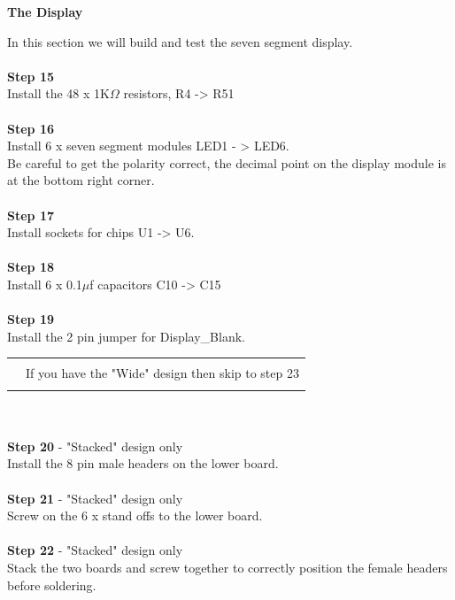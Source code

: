 \documentclass{ol-softwaremanual}
\newcommand{\Note}[1]{
\begin{table}[h]
\begin{tabular}{|p{0.1\textwidth}p{0.8\textwidth}|}
\hline
 & \\
\multicolumn{1}{|r}{\Huge\warning} & #1\\
 &  \\ \hline
\end{tabular}
\end{table}
}
\begin{document}
\begin{ffcode}
\begin{center}
\textbf{The Display}
\end{center}
In this section we will build and test the seven segment display.\\
\\
\textbf{Step 15}\\
Install the 48 x 1K$\Omega$ resistors, R4 -> R51\\
\\
\textbf{Step 16}\\
Install 6 x seven segment modules LED1 - > LED6.\\
Be careful to get the polarity correct, the decimal point on the display module is at the bottom right corner.\\
\\
\textbf{Step 17}\\
Install sockets for chips U1 -> U6.\\
\\
\textbf{Step 18}\\
Install 6 x 0.1$\mu$f capacitors C10 -> C15\\
\\
\textbf{Step 19}\\
Install the 2 pin jumper for Display\_Blank.
\Note{If you have the "Wide" design then skip to step 23}\\
\\
\textbf{Step 20} - "Stacked" design only\\
Install the 8 pin male headers on the lower board.\\
\\
\textbf{Step 21} - "Stacked" design only\\
Screw on the 6 x stand offs to the lower board.\\
\\
\textbf{Step 22} - "Stacked" design only\\
Stack the two boards and screw together to correctly position the female headers before soldering.\\
\pagebreak


\end{ffcode}
\end{document}
